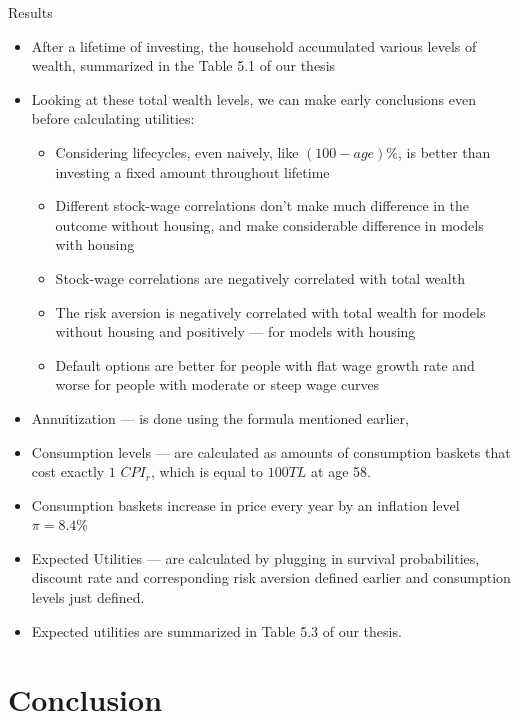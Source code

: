 \documentclass{beamer}
\begin{document}
\begin{frame}[allowframebreaks]{Results}
\begin{itemize}
\framebreak

	\item After a lifetime of investing, the household accumulated various levels of wealth, summarized in the Table 5.1 of our thesis
	\item Looking at these total wealth levels, we can make early conclusions even before calculating utilities:
	\begin{itemize}
		\item Considering lifecycles, even naively, like $(100-age)\%$, is better than investing a fixed amount throughout lifetime
		\item Different stock-wage correlations don't make much difference in the outcome without housing, and make considerable difference in models with housing
		\item Stock-wage correlations are negatively correlated with total wealth
		\item The risk aversion is negatively correlated with total wealth for models without housing and positively --- for models with housing
		\item Default options are better for people with flat wage growth rate and worse for people with moderate or steep wage curves
	\end{itemize}

\framebreak

	\item Annuitization --- is done using the formula mentioned earlier,
	\item Consumption levels --- are calculated as amounts of consumption baskets that cost exactly $1$ $CPI_{r}$, which is equal to $100 TL$ at age 58.
	\item Consumption baskets increase in price every year by an inflation level $\pi = 8.4\%$
	\item Expected Utilities --- are calculated by plugging in survival probabilities, discount rate and corresponding risk aversion defined earlier and consumption levels just defined.
	\item Expected utilities are summarized in Table 5.3 of our thesis.

  \end{itemize}
\end{frame}

\section{Conclusion}
\end{document}
